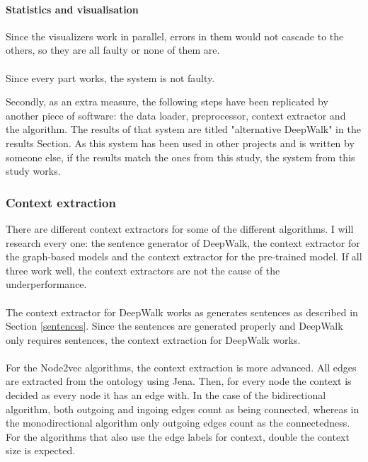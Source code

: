\documentclass{article}
\begin{document}
  \paragraph{Statistics and visualisation}
  Since the visualizers work in parallel, errors in them would not cascade to the others, so they are all faulty or none of them are.
  \paragraph{}
  Since every part works, the system is not faulty.
  
  Secondly, as an extra measure, the following steps have been replicated by another piece of software: the data loader, preprocessor, context extractor and the algorithm. The results of that system are titled "alternative DeepWalk" in the results Section. As this system has been used in other projects and is written by someone else, if the results match the ones from this study, the system from this study works.
  
  \subsubsection{Context extraction} \label{contextextraction}
  There are different context extractors for some of the different algorithms. I will research every one: the sentence generator of DeepWalk, the context extractor for the graph-based models and the context extractor for the pre-trained model. If all three work well, the context extractors are not the cause of the underperformance.
  \paragraph{}
  The context extractor for DeepWalk works as generates sentences as described in Section \ref{sentences}. Since the sentences are generated properly and DeepWalk only requires sentences, the context extraction for DeepWalk works.
  \paragraph{}
  For the Node2vec algorithms, the context extraction is more advanced. All edges are extracted from the ontology using Jena. Then, for every node the context is decided as every node it has an edge with. In the case of the bidirectional algorithm, both outgoing and ingoing edges count as being connected, whereas in the monodirectional algorithm only outgoing edges count as the connectedness. For the algorithms that also use the edge labels for context, double the context size is expected.
\end{document}
